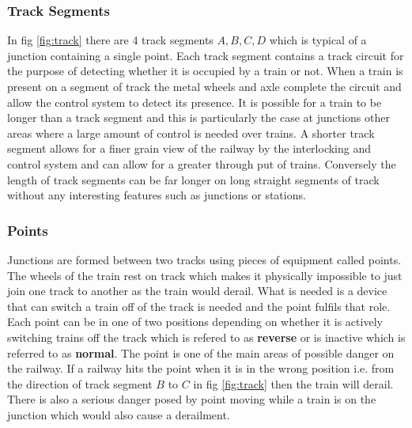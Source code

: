 \subsubsection{Track Segments}

In fig \ref{fig:track}  there are 4 track segments $A,B,C,D$ which is typical of a junction containing a single point. Each track segment contains a track circuit for the purpose of detecting whether it is occupied by a train or not. When a train is present on a segment of track the metal wheels and axle complete the circuit and allow the control system to detect its presence. It is possible for a train to be longer than a track segment and this is particularly the case at junctions other areas where a large amount of control is needed over trains. A shorter track segment allows for a finer grain view of the railway by the interlocking and control system and can allow for a greater through put of trains. Conversely the length of track segments can be far longer on long straight segments of track without any interesting features such as junctions or stations.

\begin{comment}
A section of track is typically broken down into track segments each
containing one or more track circuits to detect the presence of a
train. Typically track segments become larger on long straight stretches of
track without any interesting topological features such as junctions or
stations. Likewise track segments become smaller around junctions and stations
where control over train movement is of greater importance. 
\end{comment}


\subsubsection{Points}
Junctions are formed between two tracks using  pieces of equipment called points. The wheels of the train rest on track which makes it physically impossible to just join one track to another as the train would derail.  What is needed is a device that can switch a train off of the track is needed and the point fulfils that role.  Each point can be in one of two positions depending on whether it is actively switching trains off the track which is refered to as \textbf{reverse}  or is inactive which is referred to as \textbf{normal}. The point is one of the main areas of possible danger on the railway. If a railway hits the point when it is in the wrong position i.e. from the direction of track segment $B$ to $C$ in fig \ref{fig:track} then the train will derail. There is also a serious danger posed by point moving while a train is on the junction which would also cause a derailment.

